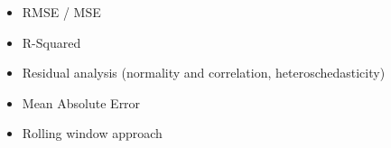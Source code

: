 \begin{itemize}
    \item RMSE / MSE
    \item R-Squared
    \item Residual analysis (normality and correlation, heteroschedasticity)
    \item Mean Absolute Error
    \item  Rolling window approach
\end{itemize}